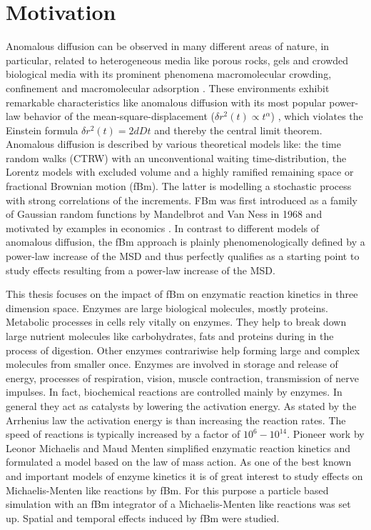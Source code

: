 \documentclass[
  a4paper,BCOR10mm,oneside,
  headsepline,footsepline,%
  fleqn,openbib
]{scrbook}
\begin{document}
\chapter*{Motivation}
Anomalous diffusion can be observed in many different areas of nature, in particular, related to heterogeneous media like porous rocks, gels and crowded biological media with its prominent phenomena macromolecular crowding, confinement and macromolecular adsorption \cite{Minton2006}. These environments exhibit remarkable characteristics like anomalous diffusion with its most popular power-law behavior of the mean-square-displacement ($\delta r^2(t)\propto t^{\alpha}$) \cite{Hofling2013}, which violates the Einstein formula $\delta r^2(t)=2 d D t$ and thereby the central limit theorem. Anomalous diffusion is described by various theoretical models like: the time random walks (CTRW) with an unconventional waiting time-distribution, the Lorentz models with excluded volume and a highly ramified remaining space  or fractional Brownian motion (fBm). The latter is modelling a stochastic process with strong correlations of the increments. FBm was first introduced as a family of Gaussian random functions by Mandelbrot and Van Ness in 1968 and motivated by examples in economics \cite{Mandelbrot1968}. In contrast to different models of anomalous diffusion, the fBm approach is plainly phenomenologically defined by a power-law increase of the MSD and thus perfectly qualifies as a starting point to study effects resulting from a power-law increase of the MSD. \par This thesis focuses on the impact of fBm on enzymatic reaction kinetics in three dimension space. Enzymes are large biological molecules, mostly proteins. Metabolic processes in cells rely vitally on enzymes. They help to break down large nutrient molecules like carbohydrates, fats and proteins during in the process of digestion. Other enzymes contrariwise help forming large and complex molecules from smaller once. Enzymes are involved in storage and release of energy, processes of respiration, vision, muscle contraction, transmission of nerve impulses. In fact, biochemical reactions are controlled mainly by enzymes. In general they act as catalysts by lowering the activation energy. As stated by the Arrhenius law the activation energy is than increasing the reaction rates. The speed of reactions is typically increased by a factor of $10^6-10^{14}$. Pioneer work by Leonor Michaelis and Maud Menten \cite{michaelis1913kinetik} simplified enzymatic reaction kinetics and formulated a model based on the law of mass action. As one of the best known and important models of enzyme kinetics it is of great interest to study effects on Michaelis-Menten like reactions by fBm. For this purpose a particle based simulation with an fBm integrator of a Michaelis-Menten like reactions was set up. Spatial and temporal effects induced by fBm were studied. 
\end{document}
